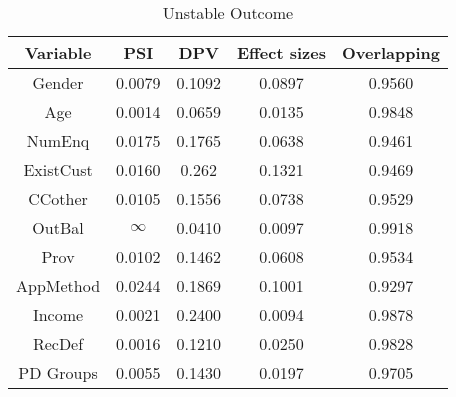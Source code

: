 \documentclass{article}
\theoremstyle{def}
\begin{document}

\begin{table}[!htbp!]%
\caption{Unstable Outcome}
\label{tabl:Unstable_out}
\centering
\small
\begin{tabular}{ccccc}
\hline
Variable & PSI & DPV & Effect sizes & Overlapping\\
\hline
Gender & 0.0079 & 0.1092 & 0.0897 & 0.9560\\
Age & 0.0014 & 0.0659 & 0.0135 & 0.9848\\
NumEnq & 0.0175 & 0.1765 & 0.0638 & 0.9461\\
ExistCust & 0.0160 & 0.262 & 0.1321 & 0.9469\\
CCother & 0.0105 & 0.1556 & 0.0738 & 0.9529\\
OutBal & $\infty$ & 0.0410 & 0.0097 & 0.9918\\
Prov & 0.0102 & 0.1462 & 0.0608 & 0.9534\\
AppMethod & 0.0244 & 0.1869 & 0.1001 & 0.9297\\
Income & 0.0021 & 0.2400 & 0.0094 & 0.9878\\
RecDef & 0.0016 & 0.1210 & 0.0250 & 0.9828\\
\hline
PD Groups & 0.0055 & 0.1430 & 0.0197 & 0.9705\\
\hline
\end{tabular}
\end{table}
\end{document}
